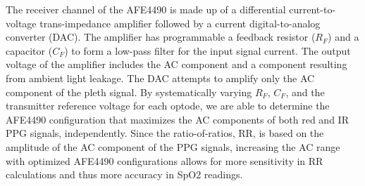 The receiver channel of the AFE4490 is made up of a differential current-to-voltage trans-impedance amplifier followed by a current digital-to-analog converter (DAC). The amplifier has programmable a feedback resistor ($R_F$) and a capacitor ($C_F$) to form a low-pass filter for the input signal current. The output voltage of the amplifier includes the AC component and a component resulting from ambient light leakage. The DAC attempts to amplify only the AC component of the pleth signal. By systematically varying $R_F$, $C_F$, and the transmitter reference voltage for each optode, we are able to determine the AFE4490 configuration that maximizes the AC components of both red and IR PPG signals, independently. Since the ratio-of-ratios, RR, is based on the amplitude of the AC component of the PPG signals, increasing the AC range with optimized AFE4490 configurations allows for more sensitivity in RR calculations and thus more accuracy in SpO2 readings. 
        
